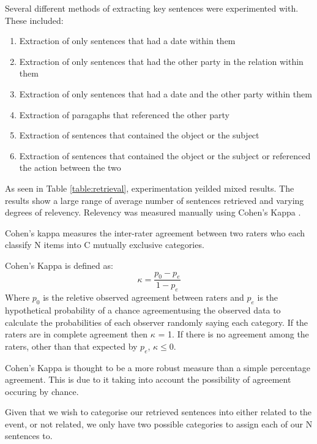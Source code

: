 \documentclass[bsc,frontabs,twoside,singlespacing,parskip,deptreport]{infthesis}     %
\begin{document}
Several different methods of extracting key sentences were experimented with.
These included:
\begin{enumerate}
  \item Extraction of only sentences that had a date within them
  \item Extraction of only sentences that had the other party in the relation within them
  \item Extraction of only sentences that had a date and the other party within them
  \item Extraction of paragaphs that referenced the other party
  \item Extraction of sentences that contained the object or the subject 
  \item Extraction of sentences that contained the object or the subject or referenced the action between the two 
\end{enumerate}


As seen in Table \ref{table:retrieval}, experimentation yeilded mixed results.
The results show a large range of average number of sentences retrieved and varying degrees of relevency.
Relevency was measured manually using Cohen's Kappa \cite{wood2007understanding}.

Cohen's kappa measures the inter-rater agreement between two raters
who each classify N items into C mutually exclusive categories.

Cohen's Kappa is defined as:\\
\begin{equation}
  \kappa = \frac{p_{0} - p_{e}}{1 - p_{e}}\nonumber
\end{equation}
Where $p_0$ is the reletive observed agreement between raters and $p_e$ is the hypothetical probability
of a chance agreementusing the observed data to calculate the probabilities of each observer randomly saying each category.
If the raters are in complete agreement then $\kappa$ = 1.
If there is no agreement among the raters, other than that expected by $p_e$, $\kappa \leq 0$.

Cohen's Kappa is thought to be a more robust measure than a simple percentage agreement.
This is due to it taking into account the possibility of agreement occuring by chance.


Given that we wish to categorise our retrieved sentences into either related to the event, or not related,
we only have two possible categories to assign each of our N sentences to.
\end{document}
